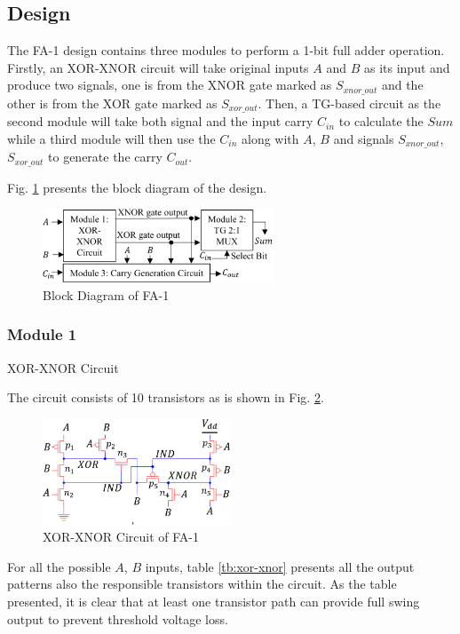 \documentclass[conference]{IEEEtran}
\begin{document}
\subsection{Design}

The FA-1 \cite{20212210429416} design contains three modules to perform a 1-bit full adder operation.
Firstly, an XOR-XNOR circuit will take original inputs \(A\) and \(B\) as its input and produce two signals,
one is from the XNOR gate marked as \(S_{xnor\_out}\) and the other is from the XOR gate marked as \( S_{xor\_out}\).
Then, a TG-based circuit as the second module will take both signal and the input carry \(C_{in}\) to calculate the \(Sum\)
while a third module will then use the \(C_{in}\) along with \(A\), \(B\) and signals \(S_{xnor\_out}\), \( S_{xor\_out}\) to generate the carry \(C_{out}\).

Fig. \ref{fig:fa1-bd} presents the block diagram of the design.

\begin{figure}[!ht]
	\centering
	\includegraphics[width=2.7in]{fa1-block diagram.png}
	\caption{Block Diagram of FA-1}
	\label{fig:fa1-bd}
\end{figure}

\subsubsection{Module 1}XOR-XNOR Circuit

The circuit consists of 10 transistors as is shown in Fig. \ref{fig:fa1-xor-xnor}.

\begin{figure}[!ht]
	\centering
	\includegraphics[width=2.2in]{fa1-xor-xnor circuit.png}
	\caption{XOR-XNOR Circuit of FA-1}
	\label{fig:fa1-xor-xnor}
\end{figure}

For all the possible \(A\), \(B\) inputs,
table \ref{tb:xor-xnor} presents all the output patterns also the responsible transistors within the circuit.
As the table presented, it is clear that at least one transistor path can provide full swing output to prevent threshold voltage loss.
\end{document}
